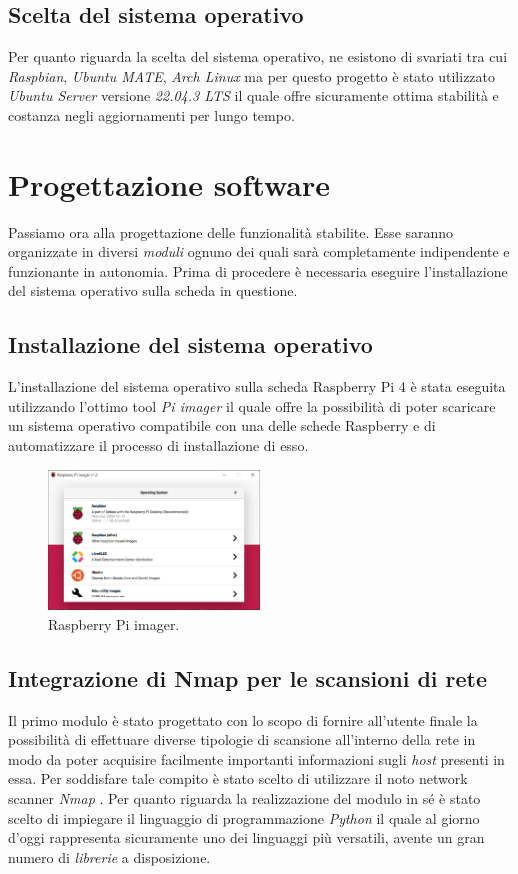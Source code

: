 \subsection{Scelta del sistema operativo}
Per quanto riguarda la scelta del sistema operativo, ne esistono di svariati tra cui \emph{Raspbian}, \emph{Ubuntu MATE}, \emph{Arch Linux} ma per questo progetto è stato utilizzato \emph{Ubuntu Server} versione \emph{22.04.3 LTS} il quale offre sicuramente ottima stabilità e costanza negli aggiornamenti per lungo tempo.

\section{Progettazione software}
Passiamo ora alla progettazione delle funzionalità stabilite. Esse saranno organizzate in diversi \emph{moduli} ognuno dei quali sarà completamente indipendente e funzionante in autonomia. Prima di procedere è necessaria eseguire l'installazione del sistema operativo sulla scheda in questione.

\subsection{Installazione del sistema operativo}
L'installazione del sistema operativo sulla scheda Raspberry Pi 4 è stata eseguita utilizzando l'ottimo tool \emph{Pi imager} il quale offre la possibilità di poter scaricare un sistema operativo compatibile con una delle schede Raspberry e di automatizzare il processo di installazione di esso.
\begin{figure}[h] \includegraphics[width=0.5\textwidth] {Tesi magistrale/capitoli/images/pi imager.png}
\centering
\caption{Raspberry Pi imager.}
\end{figure}
\newpage

\subsection{Integrazione di Nmap per le scansioni di rete}
Il primo modulo è stato progettato con lo scopo di fornire all'utente finale la possibilità di effettuare diverse tipologie di scansione all'interno della rete in modo da poter acquisire facilmente importanti informazioni sugli \emph{host} presenti in essa. Per soddisfare tale compito è stato scelto di utilizzare il noto network scanner \emph{Nmap} \cite{nm}. Per quanto riguarda la realizzazione del modulo in sé è stato scelto di impiegare il linguaggio di programmazione \emph{Python} \cite{py} il quale al giorno d'oggi rappresenta sicuramente uno dei linguaggi più versatili, avente un gran numero di \emph{librerie} a disposizione.

